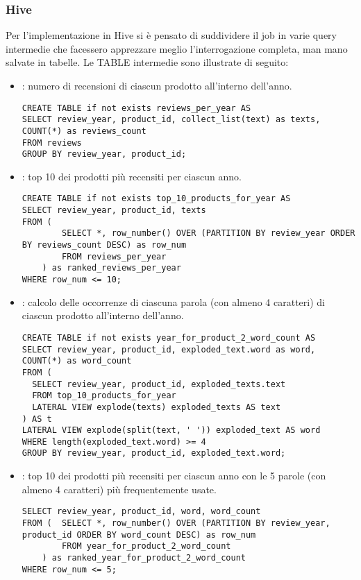\newpage
  \subsubsection{Hive}
  Per l'implementazione in Hive si è pensato di suddividere il job in varie query intermedie che facessero apprezzare meglio l'interrogazione completa, man mano salvate in tabelle. Le TABLE intermedie sono illustrate di seguito:
  \begin{itemize}
    \item {}: numero di recensioni di ciascun prodotto all'interno dell'anno.
    \begin{lstlisting}[style = all, style = SQLStyle]
CREATE TABLE if not exists reviews_per_year AS
SELECT review_year, product_id, collect_list(text) as texts, COUNT(*) as reviews_count
FROM reviews
GROUP BY review_year, product_id;
    \end{lstlisting}
    \item {}: top 10 dei prodotti più recensiti per ciascun anno.
    \begin{lstlisting}[style = all, style = SQLStyle]
CREATE TABLE if not exists top_10_products_for_year AS
SELECT review_year, product_id, texts
FROM (
        SELECT *, row_number() OVER (PARTITION BY review_year ORDER BY reviews_count DESC) as row_num
        FROM reviews_per_year 
    ) as ranked_reviews_per_year
WHERE row_num <= 10; 
    \end{lstlisting}
    
    \item {}: calcolo delle occorrenze di ciascuna parola (con almeno 4 caratteri) di ciascun prodotto all'interno dell'anno.
    \begin{lstlisting}[style=all, style = SQLStyle]
CREATE TABLE if not exists year_for_product_2_word_count AS
SELECT review_year, product_id, exploded_text.word as word, COUNT(*) as word_count
FROM (
  SELECT review_year, product_id, exploded_texts.text
  FROM top_10_products_for_year
  LATERAL VIEW explode(texts) exploded_texts AS text
) AS t
LATERAL VIEW explode(split(text, ' ')) exploded_text AS word
WHERE length(exploded_text.word) >= 4
GROUP BY review_year, product_id, exploded_text.word;
    \end{lstlisting}
    
    \item {}: top 10 dei prodotti più recensiti per ciascun anno con le 5 parole (con almeno 4 caratteri) più frequentemente usate.
    \begin{lstlisting}[style=all, style = SQLStyle]
SELECT review_year, product_id, word, word_count
FROM (  SELECT *, row_number() OVER (PARTITION BY review_year, product_id ORDER BY word_count DESC) as row_num
        FROM year_for_product_2_word_count 
    ) as ranked_year_for_product_2_word_count
WHERE row_num <= 5;
    \end{lstlisting}
  \end{itemize}
  
